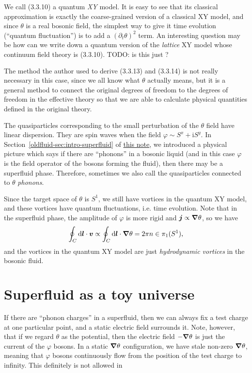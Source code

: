 \documentclass[hyperref, a4paper]{article}
\newcommand*{\ii}{\mathrm{i}}
\newcommand{\oldfluid}{\href{fluid.pdf}{this note}}
\begin{document}
We call (3.3.10) a quantum \emph{XY} model. It is easy to see that its classical approximation is 
exactly the coarse-grained version of a classical XY model, and since $\theta$ is a real bosonic field,
the simplest way to give it time evolution (``quantum fluctuation'') is to add a $(\partial_t \theta)^2$
term. An interesting question may be how can we write down a quantum version of the \emph{lattice} XY 
model whose continuum field theory is (3.3.10). TODO: is this just \cite{latticemodel,Z_iga_2014}?

The method the author used to derive (3.3.13) and (3.3.14) is not really necessary in this case, 
since we all know what $\theta$ actually means, but it is a general method to connect the original 
degrees of freedom to the degrees of freedom in the effective theory so that we are able to calculate 
physical quantities defined in the original theory.

The quasiparticles corresponding to the small perturbation of the $\theta$ field have linear dispersion. They are spin waves when 
the field $\varphi \sim S^x + \ii S^y$. In Section~\ref{oldfluid-sec:intro-superfluid} of \oldfluid,
we introduced a physical picture which says if there are ``phonons'' in a bosonic liquid (and in this case 
$\varphi$ is the field operator of the bosons forming the fluid), then there may be a superfluid phase.
Therefore, sometimes we also call the quasiparticles connected to $\theta$ \emph{phonons}.

Since the target space of $\theta$ is $S^1$, we still have vortices in the quantum XY model, and these 
vortices have quantum fluctuations, i.e. time evolution. Note that in the superfluid phase, the amplitude 
of $\varphi$ is more rigid and $\vb*{j} \propto \grad \theta$, so we have 
\[
    \oint_C \dd{\vb*{l}} \cdot \vb*{v} \propto \oint_C \dd{\vb*{l}} \cdot \grad{\theta} = 2 \pi n \in \pi_1(S^1),
\]
and the vortices in the quantum XY model are just \emph{hydrodynamic vortices} in the bosonic fluid.

\section{Superfluid as a toy universe}

If there are ``phonon charges'' in a superfluid, then we can always fix a test charge at one particular 
point, and a static electric field surrounds it. Note, however, that if we regard $\theta$ as the potential,
then the electric field $- \grad \theta$ is just the current of the $\varphi$ bosons. In a static $\grad{\theta}$
configuration, we have stale non-zero $\grad{\theta}$, meaning that $\varphi$ bosons continuously flow from 
the position of the test charge to infinity. This definitely is not allowed in 
\end{document}
